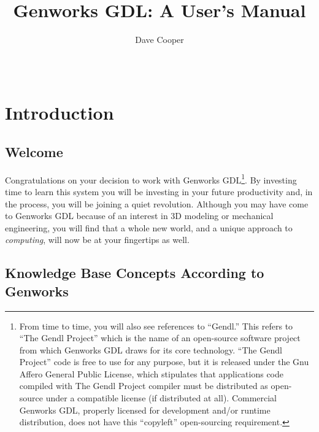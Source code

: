 \documentclass [11pt]{book}
\author {Dave Cooper}
\title {Genworks GDL: A User's Manual}
\date {\monthname\ \the\year}
\begin{document}
\frontmatter



\maketitle



\tableofcontents



\mainmatter



\chapter{Introduction}

\label{chap:introduction}



\section{Welcome}

\label{sec:welcome}

Congratulations on your decision to work with Genworks\textsuperscript{\textregistered} GDL\texttrademark\footnote{From time to time, you will also see references to
``Gendl.'' This refers to ``The Gendl Project'' which is the name of
an open-source software project from which Genworks GDL draws for its
core technology. ``The Gendl Project'' code is free to use for any
purpose, but it is released under the Gnu Affero General Public
License, which stipulates that applications code compiled with The
Gendl Project compiler must be distributed as open-source under a
compatible license (if distributed at all). Commercial Genworks GDL,
properly licensed for development and/or runtime distribution, does
not have this ``copyleft'' open-sourcing requirement.}. By investing time to learn this system you will be investing
in your future productivity and, in the process, you will be joining a
quiet revolution. Although you may have come to Genworks GDL because
of an interest in 3D modeling or mechanical engineering, you will find
that a whole new world, and a unique approach to \emph{computing}, will now be at your fingertips as well.

\section{Knowledge Base Concepts According to Genworks}
\end{document}

